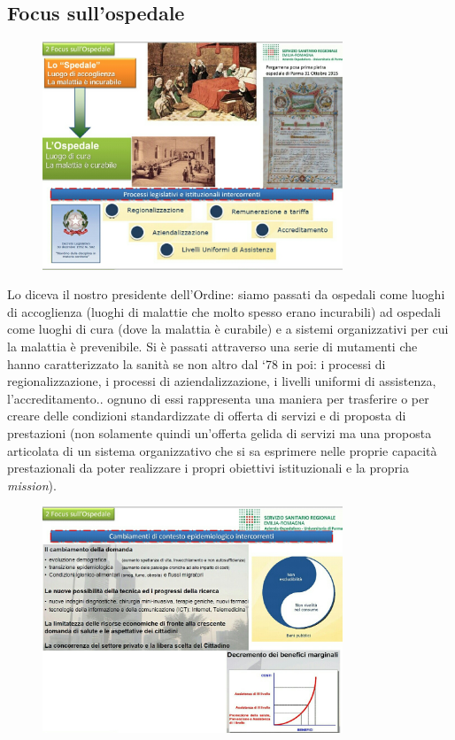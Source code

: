 \subsection{Focus sull'ospedale}

 \begin{figure}[!ht]
\centering
	\includegraphics[width=0.8\textwidth]{32/image8.jpeg}
	\end{figure}

Lo diceva il nostro presidente dell'Ordine: siamo passati da ospedali
come luoghi di accoglienza (luoghi di malattie che molto spesso erano
incurabili) ad ospedali come luoghi di cura (dove la malattia è
curabile) e a sistemi organizzativi per cui la malattia è prevenibile.
Si è passati attraverso una serie di mutamenti che hanno caratterizzato
la sanità se non altro dal `78 in poi: i processi di regionalizzazione,
i processi di aziendalizzazione, i livelli uniformi di assistenza,
l'accreditamento.. ognuno di essi rappresenta una maniera per trasferire
o per creare delle condizioni standardizzate di offerta di servizi e di
proposta di prestazioni (non solamente quindi un'offerta gelida di
servizi ma una proposta articolata di un sistema organizzativo che si sa
esprimere nelle proprie capacità prestazionali da poter realizzare i
propri obiettivi istituzionali e la propria \emph{mission}).

 \begin{figure}[!ht]
\centering
	\includegraphics[width=0.8\textwidth]{32/image9.jpeg}
	\end{figure}

